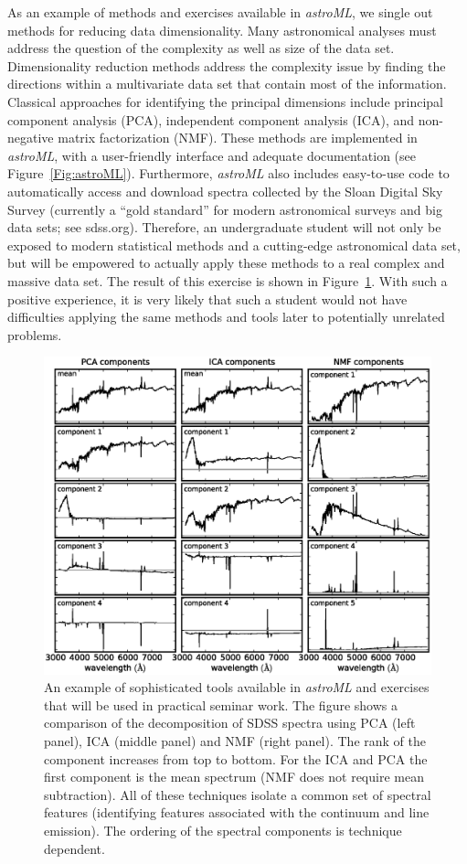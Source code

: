 As an example of methods and exercises available in  {\it astroML}, we single out methods 
for reducing data dimensionality. Many astronomical analyses must address the question of the 
complexity as well as size of the data set. Dimensionality reduction methods address the
complexity issue  by finding the directions within a multivariate data set that contain most 
of the information. Classical approaches for identifying the principal dimensions include
principal component analysis (PCA), independent component analysis (ICA), and non-negative 
matrix factorization (NMF). These methods are implemented in   {\it astroML}, with a user-friendly 
interface and adequate documentation (see Figure~\ref{Fig:astroML}). Furthermore, {\it astroML} also 
includes easy-to-use code to automatically access and download spectra collected by the Sloan Digital 
Sky Survey (currently a ``gold standard'' for modern astronomical surveys and big data sets; see sdss.org). 
Therefore, an undergraduate student will not only be exposed to modern statistical methods
and a cutting-edge astronomical data set, but will be empowered to actually apply these methods 
to a real complex and massive data set.  The result of this exercise is shown in Figure~\ref{Fig:astroML2}. 
With such a positive experience, it is very likely that such a student would not have difficulties applying 
the same methods and tools later to potentially unrelated problems.  


\begin{figure}[!t]
\vskip -1.8in
\includegraphics[width=1.02\hsize,clip]{astroML2.eps}
\vskip -2.0in
\caption{An example of sophisticated tools available in {\it astroML} and exercises that will be
used in practical seminar work. The figure shows a comparison of the decomposition of SDSS 
spectra using PCA (left panel), ICA (middle panel) and NMF (right panel). The rank of the component
increases from top to bottom. For the ICA and PCA the first component is the mean spectrum (NMF 
does not require mean subtraction). All of these techniques isolate a common set of spectral features 
(identifying features associated with the continuum and line emission). The ordering of the spectral 
components is technique dependent.} 
\label{Fig:astroML2}
\end{figure}


